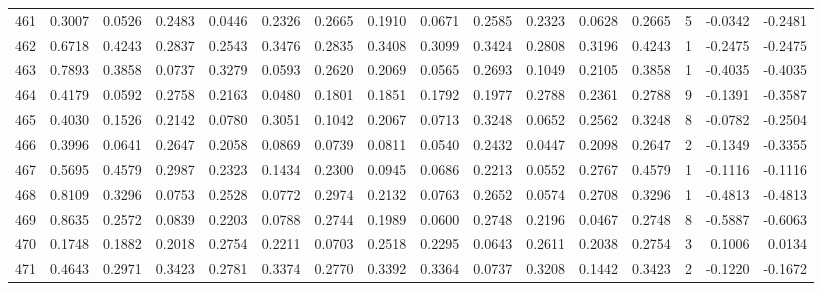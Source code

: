\begin{tabular}{lrrrrrrrrrrrrrrr}
461 &      0.3007 &  0.0526 &  0.2483 &  0.0446 &  0.2326 &  0.2665 &  0.1910 &  0.0671 &  0.2585 &  0.2323 &   0.0628 &     0.2665 &      5 &                   -0.0342 &                    -0.2481 \\
462 &      0.6718 &  0.4243 &  0.2837 &  0.2543 &  0.3476 &  0.2835 &  0.3408 &  0.3099 &  0.3424 &  0.2808 &   0.3196 &     0.4243 &      1 &                   -0.2475 &                    -0.2475 \\
463 &      0.7893 &  0.3858 &  0.0737 &  0.3279 &  0.0593 &  0.2620 &  0.2069 &  0.0565 &  0.2693 &  0.1049 &   0.2105 &     0.3858 &      1 &                   -0.4035 &                    -0.4035 \\
464 &      0.4179 &  0.0592 &  0.2758 &  0.2163 &  0.0480 &  0.1801 &  0.1851 &  0.1792 &  0.1977 &  0.2788 &   0.2361 &     0.2788 &      9 &                   -0.1391 &                    -0.3587 \\
465 &      0.4030 &  0.1526 &  0.2142 &  0.0780 &  0.3051 &  0.1042 &  0.2067 &  0.0713 &  0.3248 &  0.0652 &   0.2562 &     0.3248 &      8 &                   -0.0782 &                    -0.2504 \\
466 &      0.3996 &  0.0641 &  0.2647 &  0.2058 &  0.0869 &  0.0739 &  0.0811 &  0.0540 &  0.2432 &  0.0447 &   0.2098 &     0.2647 &      2 &                   -0.1349 &                    -0.3355 \\
467 &      0.5695 &  0.4579 &  0.2987 &  0.2323 &  0.1434 &  0.2300 &  0.0945 &  0.0686 &  0.2213 &  0.0552 &   0.2767 &     0.4579 &      1 &                   -0.1116 &                    -0.1116 \\
468 &      0.8109 &  0.3296 &  0.0753 &  0.2528 &  0.0772 &  0.2974 &  0.2132 &  0.0763 &  0.2652 &  0.0574 &   0.2708 &     0.3296 &      1 &                   -0.4813 &                    -0.4813 \\
469 &      0.8635 &  0.2572 &  0.0839 &  0.2203 &  0.0788 &  0.2744 &  0.1989 &  0.0600 &  0.2748 &  0.2196 &   0.0467 &     0.2748 &      8 &                   -0.5887 &                    -0.6063 \\
470 &      0.1748 &  0.1882 &  0.2018 &  0.2754 &  0.2211 &  0.0703 &  0.2518 &  0.2295 &  0.0643 &  0.2611 &   0.2038 &     0.2754 &      3 &                    0.1006 &                     0.0134 \\
471 &      0.4643 &  0.2971 &  0.3423 &  0.2781 &  0.3374 &  0.2770 &  0.3392 &  0.3364 &  0.0737 &  0.3208 &   0.1442 &     0.3423 &      2 &                   -0.1220 &                    -0.1672 \\

\end{tabular}
